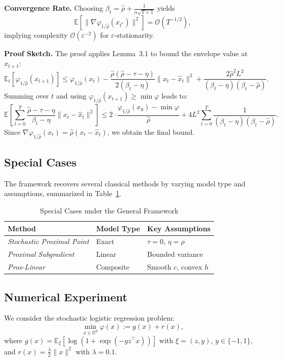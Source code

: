 \documentclass{article}
\begin{document}
\textbf{Convergence Rate.} Choosing $\beta_t = \hat{\rho} + \frac{1}{\alpha\sqrt{T+1}}$ yields
\[
\mathbb{E}\left[ \|\nabla \varphi_{1/\hat{\rho}}(x_{t^*})\|^2 \right] = \mathcal{O}(T^{-1/2}),
\]
implying complexity $\mathcal{O}(\varepsilon^{-2})$ for $\varepsilon$-stationarity.

\textbf{Proof Sketch.} The proof applies Lemma~3.1 to bound the envelope value at $x_{t+1}$:
\[
\mathbb{E}_t[\varphi_{1/\hat{\rho}}(x_{t+1})] \leq \varphi_{1/\hat{\rho}}(x_t) - \frac{\hat{\rho}(\hat{\rho} - \tau - \eta)}{2(\beta_t - \eta)} \|x_t - \hat{x}_t\|^2 + \frac{2\hat{\rho}^2 L^2}{(\beta_t - \eta)(\beta_t - \hat{\rho})}.
\]
Summing over $t$ and using $\varphi_{1/\hat{\rho}}(x_{t+1}) \geq \min \varphi$ leads to:
\[
\mathbb{E} \left[ \sum_{t=0}^{T} \frac{\hat{\rho} - \tau - \eta}{\beta_t - \eta} \|x_t - \hat{x}_t\|^2 \right]
\leq
2 \cdot \frac{\varphi_{1/\hat{\rho}}(x_0) - \min \varphi}{\hat{\rho}} + 4L^2 \sum_{t=0}^{T} \frac{1}{(\beta_t - \eta)(\beta_t - \hat{\rho})}.
\]
Since $\nabla \varphi_{1/\hat{\rho}}(x_t) = \hat{\rho}(x_t - \hat{x}_t)$, we obtain the final bound.

\subsection{Special Cases}

The framework recovers several classical methods by varying model type and assumptions, summarized in Table~\ref{tab:special_cases}.

\begin{table}[h]
\centering
\caption{Special Cases under the General Framework}
\label{tab:special_cases}
\begin{tabular}{lll}
\toprule
Method & Model Type & Key Assumptions \\
\midrule
\textit{Stochastic Proximal Point} & Exact & $\tau = 0$, $\eta = \rho$ \\
\textit{Proximal Subgradient} & Linear & Bounded variance \\
\textit{Prox-Linear} & Composite   & Smooth $c$, convex $h$ \\
\bottomrule
\end{tabular}
\end{table}

\subsection{Numerical Experiment}

We consider the stochastic logistic regression problem:
\[
\min_{x \in \mathbb{R}^d} \varphi(x) := g(x) + r(x),
\]
where \(g(x) = \mathbb{E}_\xi \left[ \log \left( 1 + \exp(-y z^\top x) \right) \right]\) with \(\xi = (z, y)\), \(y \in \{-1, 1\}\), and \(r(x) = \frac{\lambda}{2} \|x\|^2\) with \(\lambda = 0.1\).
\end{document}
